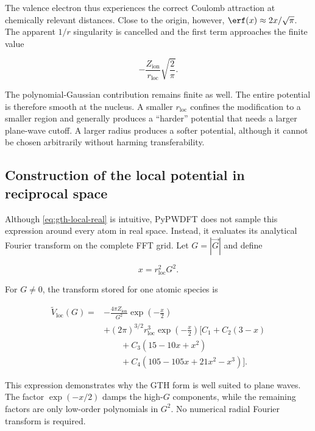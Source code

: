 The valence electron thus experiences the correct Coulomb attraction at chemically relevant distances. Close to the origin, however, $\erf(x)\approx 2x/\sqrt{\pi}$. The apparent $1/r$ singularity is cancelled and the first term approaches the finite value

\begin{equation}
    -\frac{Z_{\text{ion}}}{r_{\text{loc}}}\sqrt{\frac{2}{\pi}}.
\end{equation}

The polynomial-Gaussian contribution remains finite as well. The entire potential is therefore smooth at the nucleus. A smaller $r_{\text{loc}}$ confines the modification to a smaller region and generally produces a ``harder'' potential that needs a larger plane-wave cutoff. A larger radius produces a softer potential, although it cannot be chosen arbitrarily without harming transferability.

%
%
%
\subsection{Construction of the local potential in reciprocal space}

Although \cref{eq:gth-local-real} is intuitive, PyPWDFT does not sample this expression around every atom in real space. Instead, it evaluates its analytical Fourier transform on the complete FFT grid. Let $G=|\vec{G}|$ and define

\begin{equation}
    x = r_{\text{loc}}^{2}G^{2}.
\end{equation}

For $G\neq 0$, the transform stored for one atomic species is

\begin{align}
    \widetilde{V}_{\text{loc}}(G) ={}&
    -\frac{4\pi Z_{\text{ion}}}{G^{2}}\exp\left(-\frac{x}{2}\right) \nonumber\\
    &+(2\pi)^{3/2}r_{\text{loc}}^{3}\exp\left(-\frac{x}{2}\right)
    \big[ C_{1}+C_{2}(3-x) \nonumber\\
    &\qquad+C_{3}(15-10x+x^{2}) \nonumber\\
    &\qquad
    +C_{4}(105-105x+21x^{2}-x^{3})\big].
    \label{eq:gth-local-recip}
\end{align}

This expression demonstrates why the GTH form is well suited to plane waves. The factor $\exp(-x/2)$ damps the high-$G$ components, while the remaining factors are only low-order polynomials in $G^{2}$. No numerical radial Fourier transform is required.

